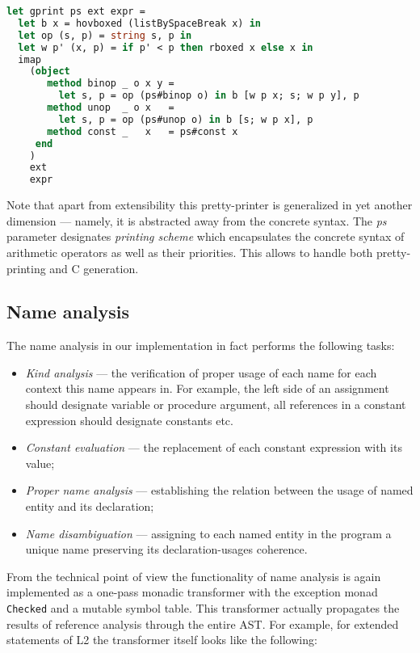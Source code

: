 \begin{lstlisting}[language=ocaml]
let gprint ps ext expr =
  let b x = hovboxed (listBySpaceBreak x) in
  let op (s, p) = string s, p in
  let w p' (x, p) = if p' < p then rboxed x else x in 
  imap  
    (object 
       method binop _ o x y = 
         let s, p = op (ps#binop o) in b [w p x; s; w p y], p
       method unop  _ o x   = 
         let s, p = op (ps#unop o) in b [s; w p x], p
       method const _   x   = ps#const x
     end
    )
    ext
    expr
\end{lstlisting}

Note that apart from extensibility this pretty-printer is generalized in yet another 
dimension --- namely, it is abstracted away from the concrete syntax. The \emph{ps}
parameter designates \emph{printing scheme} which encapsulates the concrete
syntax of arithmetic operators as well as their priorities. This allows to handle
both pretty-printing and C generation.

\subsection{Name analysis}

The name analysis in our implementation in fact performs the following tasks:

\begin{itemize}
\item \emph{Kind analysis} --- the verification of proper usage of each name for each context this
name appears in. For example, the left side of an assignment should designate variable or procedure argument,
all references in a constant expression should designate constants etc.
\item \emph{Constant evaluation} --- the replacement of each constant expression with
its value;
\item \emph{Proper name analysis} --- establishing the relation between the usage of
named entity and its declaration;
\item \emph{Name disambiguation} --- assigning to each named entity in the program a unique
name preserving its declaration-usages coherence.
\end{itemize}

From the technical point of view the functionality of name analysis is again implemented as a 
one-pass monadic transformer with the exception monad \lstinline{Checked} and a mutable symbol 
table. This transformer actually propagates the results of reference analysis through the 
entire AST. For example, for extended statements of L2 the transformer itself looks like
the following:

